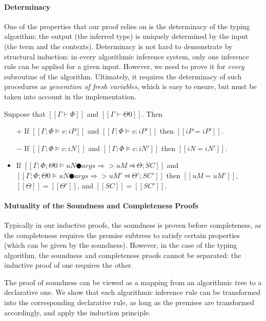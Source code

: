\vspace{\baselineskip}
\paragraph*{Determinacy}
    One of the properties that our proof relies on is the determinacy of the 
    typing algorithm: the output (the inferred type)
    is uniquely determined by the input (the term and the contexts).
    Determinacy is not hard to demonstrate by structural induction: 
    in every algorithmic inference system, only one inference rule can be applied 
    for a given input.  However, we need to prove it for \emph{every} 
    subroutine of the algorithm. Ultimately, it requires 
    the determinacy of such procedures as \emph{generation of fresh variables}, 
    which is easy to ensure, but must be taken into account in the implementation.

\begin{lemma*}
    Suppose that $[[Γ ⊢ Φ]]$ and $[[Γ ⊢ Θ0]]$. Then 
    \begin{itemize}
        \item [$+$] If $[[Γ; Φ ⊨ v : iP]]$ and $[[Γ; Φ ⊨ v : iP']]$ then $[[iP = iP']]$.
        \item [$-$] If $[[Γ; Φ ⊨ c : iN]]$ and $[[Γ; Φ ⊨ c : iN']]$ then $[[iN = iN']]$.
        \item If $[[Γ; Φ; Θ0 ⊨ uN ● args ⇒> uM ⫤ Θ; SC]]$ and 
            $[[Γ; Φ; Θ0 ⊨ uN ● args ⇒> uM' ⫤ Θ'; SC']]$ then 
            $[[uM = uM']]$, $[[Θ]] = [[Θ']]$, and $[[SC]] =[[SC']]$.  
    \end{itemize}
\end{lemma*}

\paragraph*{Mutuality of the Soundness and Completeness Proofs}

Typically in our inductive proofs, the soundness is proven before completeness,
as the completeness requires the premise subtrees to satisfy certain properties
(which can be given by the soundness). However, in the case of the typing algorithm,
the soundness and completeness proofs cannot be separated: the inductive proof
of one requires the other. 

The proof of soundness can be viewed as a mapping from an algorithmic tree to a
declarative one. We show that each algorithmic inference rule can be transformed
into the corresponding declarative rule, as long as the premises are transformed
accordingly, and apply the induction principle. 

